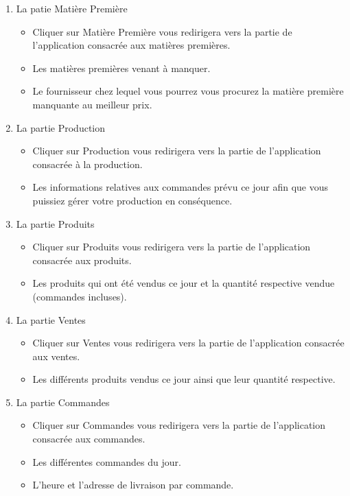 \begin{enumerate}
    \item La patie Matière Première
    \begin{itemize}
        \item Cliquer sur Matière Première vous redirigera vers la partie de
            l'application consacrée aux matières premières.
        \item Les matières premières venant à manquer.
        \item Le fournisseur chez lequel vous pourrez vous procurez la matière
            première manquante au meilleur prix.
    \end{itemize}
    \item La partie Production
    \begin{itemize}
        \item Cliquer sur Production vous redirigera vers la partie de
            l'application consacrée à la production.
        \item Les informations relatives aux commandes prévu ce jour afin que
            vous puissiez gérer votre production en conséquence.
    \end{itemize}
    \item La partie Produits
    \begin{itemize}
        \item Cliquer sur Produits vous redirigera vers la partie de
            l'application consacrée aux produits.
        \item Les produits qui ont été vendus ce jour et la quantité respective
            vendue (commandes incluses).
    \end{itemize}
    \item La partie Ventes
    \begin{itemize}
        \item Cliquer sur Ventes vous redirigera vers la partie de
            l'application consacrée aux ventes.
        \item Les différents produits vendus ce jour ainsi que leur quantité
            respective.
    \end{itemize}
    \item La partie Commandes
    \begin{itemize}
        \item Cliquer sur Commandes vous redirigera vers la partie de
            l'application consacrée aux commandes.
        \item Les différentes commandes du jour.
        \item L'heure et l'adresse de livraison par commande.
    \end{itemize}
\end{enumerate}


